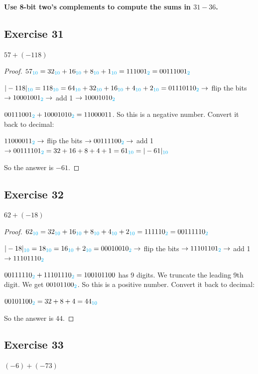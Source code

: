 \documentclass[14pt]{extarticle}
\newcommand{\base}[1]{{\color{cyan}#1}}
\begin{document}
{\bf \color{cyan} Use 8-bit two’s complements to compute the sums in $31-36$.}

\subsection{Exercise 31} 
$57 + (-118)$

\begin{proof} 
$57_\base{10} = 32_\base{10} + 16_\base{10} + 8_\base{10} +
1_\base{10} = 111001_\base{2} = 00111001_\base{2}$

$|-118|_\base{10} = 118_\base{10} = 64_\base{10} + 32_\base{10} + 16_\base{10} + 4_\base{10} + 2_\base{10} = 01110110_\base{2} \to$ flip the bits $\to 10001001_\base{2} \to$ add 1 $\to 10001010_\base{2}$

$00111001_\base{2} + 10001010_\base{2} = 1100 0011$. So this is a negative number. Convert it back to decimal:

$11000011_\base{2} \to$ flip the bits $\to 00111100_\base{2} \to$ add 1 $\to 00111101_\base{2} = 32 + 16 + 8 + 4 + 1 = 61_\base{10} = |-61|_\base{10}$

So the answer is $-61$. 
\end{proof}

\subsection{Exercise 32} 
$62 + (-18)$

\begin{proof} 
$62_\base{10} = 32_\base{10} + 16_\base{10} + 8_\base{10} + 4_\base{10} + 2_\base{10} = 111110_\base{2} = 00111110_\base{2}$

$|-18|_\base{10} = 18_\base{10} = 16_\base{10} + 2_\base{10} = 00010010_\base{2} \to$ flip the bits $\to 11101101_\base{2} \to$ add 1 $\to 11101110_\base{2}$

$00111110_\base{2} + 11101110_\base{2} = 1 0010 1100$ has 9 digits. We truncate the leading 9th digit. We get $00101100_\base{2}$. So this is a positive number. Convert it back to decimal:

$00101100_\base{2} = 32 + 8 + 4 = 44_\base{10}$

So the answer is $44$. 
\end{proof}

\subsection{Exercise 33} 
$(-6) + (-73)$
\end{document}
